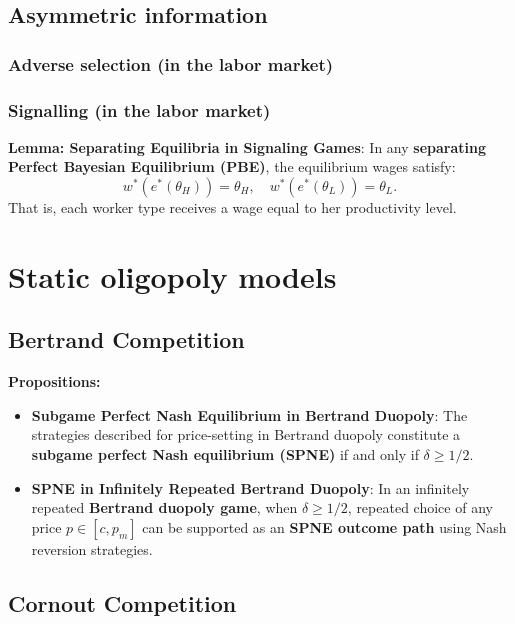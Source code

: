 \documentclass{article}
\begin{document}
\subsection{Asymmetric information}

\subsubsection{Adverse selection (in the labor market)}

\subsubsection{Signalling (in the labor market)}

\textbf{Lemma: Separating Equilibria in Signaling Games}: In any \textbf{separating Perfect Bayesian Equilibrium (PBE)}, the equilibrium wages satisfy:
\[
w^*(e^*(\theta_H)) = \theta_H, \quad w^*(e^*(\theta_L)) = \theta_L.
\]
That is, each worker type receives a wage equal to her productivity level.




\section{Static oligopoly models}\label{SO}

\subsection{Bertrand Competition}

\textbf{Propositions:}
\begin{itemize}
    \item \textbf{Subgame Perfect Nash Equilibrium in Bertrand Duopoly}: The strategies described for price-setting in Bertrand duopoly constitute a \textbf{subgame perfect Nash equilibrium (SPNE)} if and only if $\delta \geq 1/2$.
    
    \item \textbf{SPNE in Infinitely Repeated Bertrand Duopoly}: In an infinitely repeated \textbf{Bertrand duopoly game}, when $\delta \geq 1/2$, repeated choice of any price $p \in [c, p_m]$ can be supported as an \textbf{SPNE outcome path} using Nash reversion strategies.

\end{itemize}




\subsection{Cornout Competition}
\end{document}

